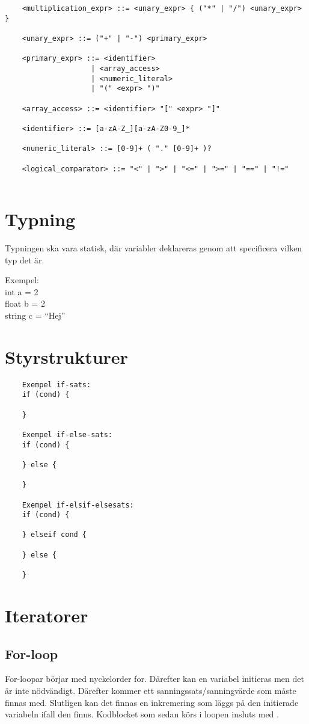 \documentclass{TDP003mall}
\begin{document}
\begin{verbatim}
    <multiplication_expr> ::= <unary_expr> { ("*" | "/") <unary_expr> }

    <unary_expr> ::= ("+" | "-") <primary_expr>

    <primary_expr> ::= <identifier> 
                    | <array_access>
                    | <numeric_literal> 
                    | "(" <expr> ")"

    <array_access> ::= <identifier> "[" <expr> "]"

    <identifier> ::= [a-zA-Z_][a-zA-Z0-9_]*

    <numeric_literal> ::= [0-9]+ ( "." [0-9]+ )?

    <logical_comparator> ::= "<" | ">" | "<=" | ">=" | "==" | "!="
    
    \end{verbatim}

    \section{Typning}
    Typningen ska vara statisk, där variabler deklareras genom att specificera vilken typ det är.

    Exempel: \\
    int a = 2 \\
    float b = 2 \\
    string c = ``Hej''

    \section{Styrstrukturer}
\begin{verbatim}
    Exempel if-sats:
    if (cond) {
      
    }

    Exempel if-else-sats:
    if (cond) {
      
    } else {

    }

    Exempel if-elsif-elsesats:
    if (cond) {
      
    } elseif cond {

    } else {

    }
\end{verbatim}

\section{Iteratorer}

\subsection{For-loop}
For-loopar börjar med nyckelorder for. Därefter kan en variabel initieras men det är inte nödvändigt. Därefter kommer ett sanningssats/sanningvärde som måste finnas med. Slutligen kan det finnas en inkremering som läggs på den initierade variabeln ifall den finns. Kodblocket som sedan körs i loopen insluts med {}.
\end{document}
